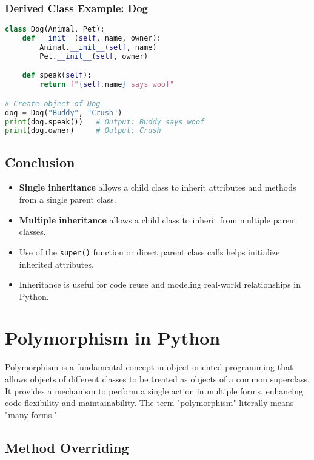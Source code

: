 \subsection{Derived Class Example: Dog}

\begin{lstlisting}[language=Python]
class Dog(Animal, Pet):
    def __init__(self, name, owner):
        Animal.__init__(self, name)
        Pet.__init__(self, owner)

    def speak(self):
        return f"{self.name} says woof"

# Create object of Dog
dog = Dog("Buddy", "Crush")
print(dog.speak())   # Output: Buddy says woof
print(dog.owner)     # Output: Crush
\end{lstlisting}

\section{Conclusion}

\begin{itemize}
    \item \textbf{Single inheritance} allows a child class to inherit attributes and methods from a single parent class.
    \item \textbf{Multiple inheritance} allows a child class to inherit from multiple parent classes.
    \item Use of the \texttt{super()} function or direct parent class calls helps initialize inherited attributes.
    \item Inheritance is useful for code reuse and modeling real-world relationships in Python.
\end{itemize}


\chapter{Polymorphism in Python}

Polymorphism is a fundamental concept in object-oriented programming that allows objects of different classes to be treated as objects of a common superclass. It provides a mechanism to perform a single action in multiple forms, enhancing code flexibility and maintainability. The term "polymorphism" literally means "many forms."

\section{Method Overriding}

